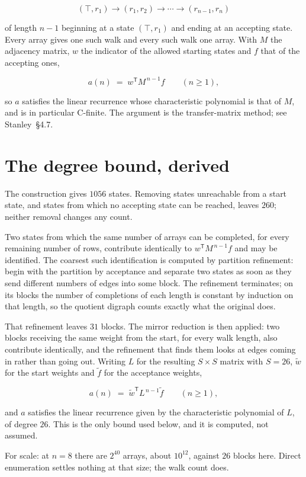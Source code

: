 \documentclass[11pt]{article}
\theoremstyle{definition}
\begin{document}
\[(\top,r_1) \to (r_1,r_2) \to \cdots \to (r_{n-1},r_n)\]

of length $n-1$ beginning at a state $(\top,r_1)$ and ending at an accepting state. Every array gives one such walk and every such walk one array. With $M$ the adjacency matrix, $w$ the indicator of the allowed starting states and $f$ that of the accepting ones,

\[a(n) \;=\; w^{\mathsf T} M^{\,n-1} f \qquad (n \ge 1),\]

so $a$ satisfies the linear recurrence whose characteristic polynomial is that of $M$, and is in particular C-finite. The argument is the transfer-matrix method; see Stanley~\S4.7.

\section{The degree bound, derived}

The construction gives $1056$ states. Removing states unreachable from a start state, and states from which no accepting state can be reached, leaves $260$; neither removal changes any count.

Two states from which the same number of arrays can be completed, for every remaining number of rows, contribute identically to $w^{\mathsf T}M^{\,n-1}f$ and may be identified. The coarsest such identification is computed by partition refinement: begin with the partition by acceptance and separate two states as soon as they send different numbers of edges into some block. The refinement terminates; on its blocks the number of completions of each length is constant by induction on that length, so the quotient digraph counts exactly what the original does.

That refinement leaves $31$ blocks. The mirror reduction is then applied: two blocks receiving the same weight from the start, for every walk length, also contribute identically, and the refinement that finds them looks at edges coming in rather than going out. Writing $L$ for the resulting $S \times S$ matrix with $S = 26$, $\tilde w$ for the start weights and $\tilde f$ for the acceptance weights,

\[a(n) \;=\; \tilde w^{\mathsf T} L^{\,n-1} \tilde f \qquad (n \ge 1),\]

and $a$ satisfies the linear recurrence given by the characteristic polynomial of $L$, of degree $26$. This is the only bound used below, and it is computed, not assumed.

For scale: at $n = 8$ there are $2^{40}$ arrays, about $10^{12}$, against $26$ blocks here. Direct enumeration settles nothing at that size; the walk count does.
\end{document}
